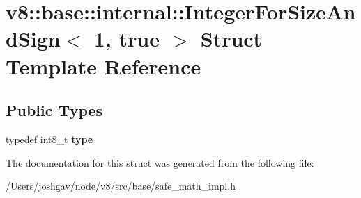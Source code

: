 \hypertarget{structv8_1_1base_1_1internal_1_1_integer_for_size_and_sign_3_011_00_01true_01_4}{}\section{v8\+:\+:base\+:\+:internal\+:\+:Integer\+For\+Size\+And\+Sign$<$ 1, true $>$ Struct Template Reference}
\label{structv8_1_1base_1_1internal_1_1_integer_for_size_and_sign_3_011_00_01true_01_4}
\subsection*{Public Types}
\begin{DoxyCompactItemize}
\item 
typedef int8\+\_\+t {\bfseries type}\hypertarget{structv8_1_1base_1_1internal_1_1_integer_for_size_and_sign_3_011_00_01true_01_4_a144d8dc4a31cf1d301c5b005991d4a1d}{}\label{structv8_1_1base_1_1internal_1_1_integer_for_size_and_sign_3_011_00_01true_01_4_a144d8dc4a31cf1d301c5b005991d4a1d}

\end{DoxyCompactItemize}


The documentation for this struct was generated from the following file\+:\begin{DoxyCompactItemize}
\item 
/\+Users/joshgav/node/v8/src/base/safe\+\_\+math\+\_\+impl.\+h\end{DoxyCompactItemize}
